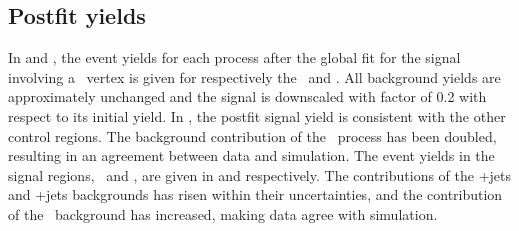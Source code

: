 \clearpage
\subsection{Postfit yields}
\label{sec:postfityields}
In  and , the  event yields for each process after the global fit for the signal involving a \Zut\ vertex is given for respectively the \STCR\ and \TTCR. All background yields are approximately unchanged and the signal is downscaled with factor of 0.2 with respect to its initial yield. In , the postfit signal yield is consistent with the other control regions. The background contribution of the \NPL\ process has been doubled, resulting in an agreement between data and simulation. The event yields in the signal regions, \STSR\ and \TTSR, are given in  and  respectively. The contributions of the \WZ+jets and \ttZ+jets backgrounds has risen within their uncertainties, and the contribution of the \NPL\ background has increased, making data agree with simulation. 

